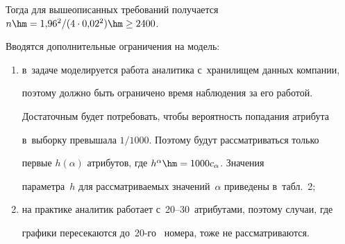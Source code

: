   


Тогда для вышеописанных требований получается $n\hm= 1{,}96^2/(4\cdot 


0{,}02^2) \hm \geq 2400$.





  Вводятся дополнительные ограничения на модель:


  \begin{enumerate}[(1)]


\item  в~задаче моделируется работа аналитика с~хранилищем данных компании, 


поэтому должно быть ограничено время наблюдения за его работой. 


Достаточным будет потребовать, чтобы вероятность попадания атрибута 


в~выборку превышала $1/1000$. Поэтому будут рассматриваться только 


первые $h(\alpha)$ атрибутов, где $h^\alpha\hm= 1000 c_\alpha$. Значения 


параметра~$h$ для рассматриваемых значений~$\alpha$ приведены в~табл.~2;








\item на практике аналитик работает с~20--30~атрибутами, поэтому случаи, где 


графики пересекаются до~20-го~ номера, тоже не рассматриваются. 


\end{enumerate}





\renewcommand{\figurename}{\protect\bf Таблица}








\setcounter{figure}{1}








